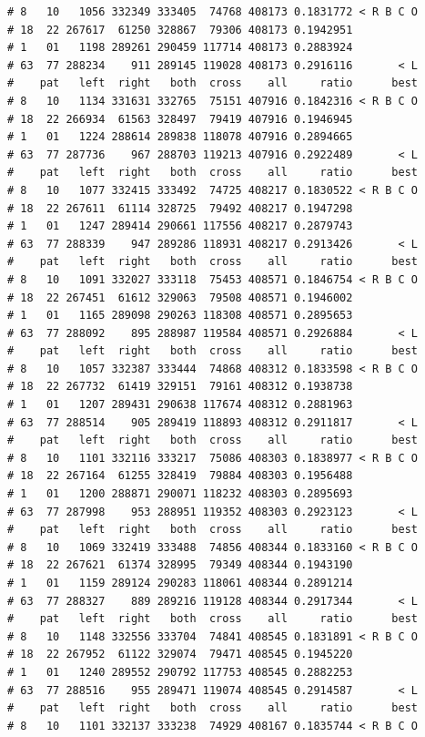\documentclass{article}\usepackage[]{graphicx}\usepackage[]{color}
\makeatletter
\newenvironment{kframe}{%
 \def\at@end@of@kframe{}%
 \ifinner\ifhmode%
  \def\at@end@of@kframe{\end{minipage}}%
  \begin{minipage}{\columnwidth}%
 \fi\fi%
 \def\FrameCommand##1{\hskip\@totalleftmargin \hskip-\fboxsep
 \colorbox{shadecolor}{##1}\hskip-\fboxsep
     \hskip-\linewidth \hskip-\@totalleftmargin \hskip\columnwidth}%
 \MakeFramed {\advance\hsize-\width
   \@totalleftmargin\z@ \linewidth\hsize
   \@setminipage}}%
 {\par\unskip\endMakeFramed%
 \at@end@of@kframe}
\newenvironment{knitrout}{}{} %
\makeatother
\begin{document}
\begin{knitrout}
\begin{kframe}
\begin{verbatim}
# 8   10   1056 332349 333405  74768 408173 0.1831772 < R B C O
# 18  22 267617  61250 328867  79306 408173 0.1942951          
# 1   01   1198 289261 290459 117714 408173 0.2883924          
# 63  77 288234    911 289145 119028 408173 0.2916116       < L
#    pat   left  right   both  cross    all     ratio      best
# 8   10   1134 331631 332765  75151 407916 0.1842316 < R B C O
# 18  22 266934  61563 328497  79419 407916 0.1946945          
# 1   01   1224 288614 289838 118078 407916 0.2894665          
# 63  77 287736    967 288703 119213 407916 0.2922489       < L
#    pat   left  right   both  cross    all     ratio      best
# 8   10   1077 332415 333492  74725 408217 0.1830522 < R B C O
# 18  22 267611  61114 328725  79492 408217 0.1947298          
# 1   01   1247 289414 290661 117556 408217 0.2879743          
# 63  77 288339    947 289286 118931 408217 0.2913426       < L
#    pat   left  right   both  cross    all     ratio      best
# 8   10   1091 332027 333118  75453 408571 0.1846754 < R B C O
# 18  22 267451  61612 329063  79508 408571 0.1946002          
# 1   01   1165 289098 290263 118308 408571 0.2895653          
# 63  77 288092    895 288987 119584 408571 0.2926884       < L
#    pat   left  right   both  cross    all     ratio      best
# 8   10   1057 332387 333444  74868 408312 0.1833598 < R B C O
# 18  22 267732  61419 329151  79161 408312 0.1938738          
# 1   01   1207 289431 290638 117674 408312 0.2881963          
# 63  77 288514    905 289419 118893 408312 0.2911817       < L
#    pat   left  right   both  cross    all     ratio      best
# 8   10   1101 332116 333217  75086 408303 0.1838977 < R B C O
# 18  22 267164  61255 328419  79884 408303 0.1956488          
# 1   01   1200 288871 290071 118232 408303 0.2895693          
# 63  77 287998    953 288951 119352 408303 0.2923123       < L
#    pat   left  right   both  cross    all     ratio      best
# 8   10   1069 332419 333488  74856 408344 0.1833160 < R B C O
# 18  22 267621  61374 328995  79349 408344 0.1943190          
# 1   01   1159 289124 290283 118061 408344 0.2891214          
# 63  77 288327    889 289216 119128 408344 0.2917344       < L
#    pat   left  right   both  cross    all     ratio      best
# 8   10   1148 332556 333704  74841 408545 0.1831891 < R B C O
# 18  22 267952  61122 329074  79471 408545 0.1945220          
# 1   01   1240 289552 290792 117753 408545 0.2882253          
# 63  77 288516    955 289471 119074 408545 0.2914587       < L
#    pat   left  right   both  cross    all     ratio      best
# 8   10   1101 332137 333238  74929 408167 0.1835744 < R B C O

\end{verbatim}
\end{kframe}
\end{knitrout}
\end{document}
